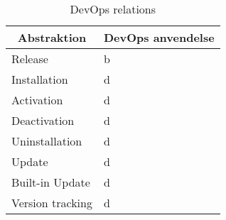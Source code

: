 \begin{table}[H]
    \begin{small}
        \caption{DevOps relations}
        \label{tab:devops-relation}
        \begin{center}
            \begin{tabular}[c]{l|l}
                \multicolumn{1}{c|}{\textbf{Abstraktion}} & 
                \multicolumn{1}{c}{\textbf{DevOps anvendelse}} \\
                \hline
                Release & b \\
                Installation & d \\
                Activation & d \\
                Deactivation & d \\
                Uninstallation & d \\
                Update & d \\
                Built-in Update & d \\
                Version tracking & d \\
                
            \end{tabular}
        \end{center}
    \end{small}
\end{table}
